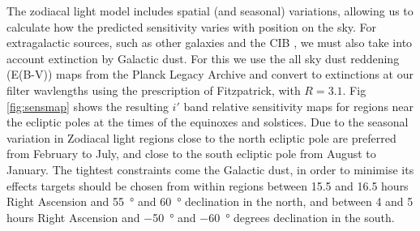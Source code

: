 \documentclass[]{iac}
\begin{document}
The zodiacal light model includes spatial (and seasonal) variations, allowing us to calculate how the predicted
sensitivity varies with position on the sky. For extragalactic sources, such as other galaxies and the CIB
, we must also take into account extinction by Galactic dust. For this we use the all sky dust reddening
(E(B-V)) maps from the Planck Legacy Archive\cite{Abergel2014} and convert to extinctions at our filter wavlengths using
the prescription of Fitzpatrick\cite{Fitzpatrick1999}, with $R=3.1$.  Fig \ref{fig:sensmap} shows the resulting $i'$
band relative sensitivity maps for regions near the ecliptic poles at the times of the equinoxes and solstices. Due to
the seasonal variation in Zodiacal light regions close to the north ecliptic pole are preferred from February to July,
and close to the south ecliptic pole from August to January. The tightest constraints come the Galactic dust, in order
to minimise its effects targets should be chosen from within regions between 15.5 and 16.5 hours Right Ascension and
\SI{+55}{\degree} and \SI{+60}{\degree} declination in the north, and between 4 and 5 hours Right Ascension and
\SI{-50}{\degree} and \SI{-60}{\degree} degrees declination
in the south.
\end{document}
